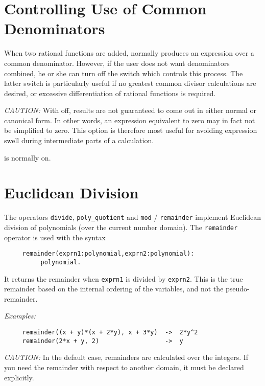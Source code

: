 \section{Controlling Use of Common Denominators}
\hypertarget{switch:MCD}{}

When two rational functions are added, {\REDUCE} normally produces an
expression over a common denominator. However, if the user does not want
denominators combined, he or she can turn off the switch 
 which controls this process.  The latter switch is
particularly useful if no greatest common divisor calculations are
desired, or excessive differentiation of rational functions is required.

\textit{CAUTION:}  With  off, results are not guaranteed to come out in
either normal or canonical form.  In other words, an expression equivalent
to zero may in fact not be simplified to zero.  This option is therefore
most useful for avoiding expression swell during intermediate parts of a
calculation.

 is normally on.

\section{Euclidean Division}
\hypertarget{operator:DIVIDE}{}
\hypertarget{operator:POLY_QUOTIENT}{}
\hypertarget{operator:REMAINDER}{}
\hypertarget{operator:MOD}{}

The operators \texttt{divide}, \texttt{poly\_quotient} and
\texttt{mod} / \texttt{remainder} implement Euclidean division of
polynomials (over the current number domain).
The \texttt{remainder} operator is used with the syntax
\begin{verbatim}
     remainder(exprn1:polynomial,exprn2:polynomial):
          polynomial.
\end{verbatim}
It returns the remainder when \texttt{exprn1} is divided by \texttt{exprn2}.  This
is the true remainder based on the internal ordering of the variables, and
not the pseudo-remainder. 

\textit{Examples:}
\begin{verbatim}
     remainder((x + y)*(x + 2*y), x + 3*y)  ->  2*y^2
     remainder(2*x + y, 2)                  ->  y
\end{verbatim}

\textit{CAUTION:} In the default case, remainders are calculated over the
integers.  If you need the remainder with respect to another domain, it
must be declared explicitly.

